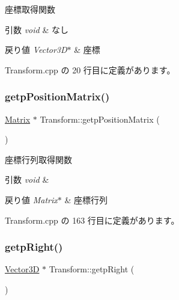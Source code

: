 座標取得関数 


\begin{DoxyParams}{引数}
{\em void} & なし \\
\hline
\end{DoxyParams}

\begin{DoxyRetVals}{戻り値}
{\em Vector3\+D$\ast$} & 座標 \\
\hline
\end{DoxyRetVals}


 Transform.\+cpp の 20 行目に定義があります。

\mbox{\label{class_transform_a825ad9edaf799a83076cbb9f78852649}} 
\subsubsection{\texorpdfstring{getp\+Position\+Matrix()}{getpPositionMatrix()}}
{\footnotesize\ttfamily \mbox{\hyperlink{class_matrix}{Matrix}} $\ast$ Transform\+::getp\+Position\+Matrix (\begin{DoxyParamCaption}{ }\end{DoxyParamCaption})}



座標行列取得関数 


\begin{DoxyParams}{引数}
{\em void} & \\
\hline
\end{DoxyParams}

\begin{DoxyRetVals}{戻り値}
{\em Matrix$\ast$} & 座標行列 \\
\hline
\end{DoxyRetVals}


 Transform.\+cpp の 163 行目に定義があります。

\mbox{\label{class_transform_a636334048ae8fb50455ec8fd290668d6}} 
\subsubsection{\texorpdfstring{getp\+Right()}{getpRight()}}
{\footnotesize\ttfamily \mbox{\hyperlink{class_vector3_d}{Vector3D}} $\ast$ Transform\+::getp\+Right (\begin{DoxyParamCaption}{ }\end{DoxyParamCaption})}



